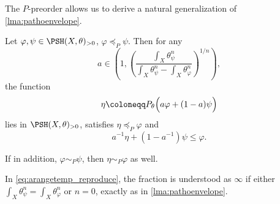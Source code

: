 The $P$-preorder allows us to derive a natural generalization of \cref{lma:pathoenvelope}.
\begin{theorem}\label{thm:pathoenvelope}
    Let $\varphi,\psi\in \PSH(X,\theta)_{>0}$, $\varphi\preceq_P \psi$. Then for any
    \begin{equation}\label{eq:arangetemp_reproduce}
        a\in \left( 1, \left(\frac{\int_X \theta_{\psi}^n}{\int_X \theta_{\psi}^n-\int_X \theta_{\varphi}^n}\right)^{1/n} \right),
    \end{equation}
    the function
    \[
        \eta\coloneqq P_{\theta}\Bigl(a\varphi+(1-a)\psi\Bigr)
    \]
    lies in $\PSH(X,\theta)_{>0}$, satisfies $\eta\preceq_P \varphi$ and
    \begin{equation}\label{eq:path_env_reproduce}
        a^{-1}\eta+\left(1-a^{-1}\right)\psi\leq \varphi.
    \end{equation}

    If in addition, $\varphi\sim_P \psi$, then $\eta\sim_P \varphi$ as well.
\end{theorem}
In \eqref{eq:arangetemp_reproduce}, the fraction is understood as $\infty$ if either $\int_X \theta_{\psi}^n=\int_X \theta_{\varphi}^n$ or $n=0$, exactly as in \cref{lma:pathoenvelope}.
